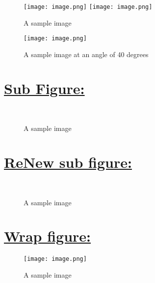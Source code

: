 \documentclass{book}
\begin{document}
\begin{figure}[!htbp]
	\texttt{[image: image.png]} \hfill
	\texttt{[image: image.png]}
	\caption{A sample image}
	\label{fig:image}
\end{figure}
\begin{figure}[!htbp]
	\centering
	\texttt{[image: image.png]}
	\caption{A sample image at an angle of 40 degrees}
\end{figure}
\newpage
\section*{\underline{Sub Figure:}}
\begin{figure}[!htbp]
	\centering
	 \hfill
	 \\
	\caption{A sample image}
\end{figure}

\newpage
\section*{\underline{ReNew sub figure:}}
\renewcommand{\thesubfigure}{(\roman{subfigure}).}
\begin{figure}[!htbp]
	\centering
	 \hfill
	 \\
	\caption{A sample image}
\end{figure}
\newpage
\section*{\underline{Wrap figure:}}
\begin{wrapfigure}{r}{0.5\textwidth}
	\centering
	\texttt{[image: image.png]}
	\caption{A sample image}
\end{wrapfigure}
\lipsum[1]
\end{document}
